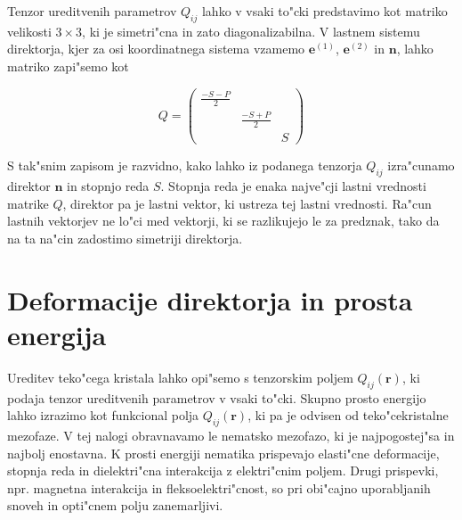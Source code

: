 \documentclass[12pt,twoside,openright,final,a4paper]{report}
\renewcommand{\vec}{\mathbf}
\begin{document}
Tenzor ureditvenih parametrov $Q_{ij}$ lahko v vsaki to"cki predstavimo kot matriko velikosti $3\times 3$, ki je simetri"cna in zato diagonalizabilna. 
V lastnem sistemu direktorja, kjer za osi koordinatnega sistema vzamemo $\vec e^{(1)}$, $\vec e^{(2)}$ in $\vec n$, lahko matriko zapi"semo kot

\begin{equation}
 Q = \begin{pmatrix}
   \frac{-S-P}{2} & & \\
  & \frac{-S+P}{2} & \\
    &   & S
 \end{pmatrix}
\end{equation}

S tak"snim zapisom je razvidno, kako lahko iz podanega tenzorja $Q_{ij}$ izra"cunamo direktor $\vec n$ in stopnjo reda $S$. 
Stopnja reda je enaka najve"cji lastni vrednosti matrike $Q$, direktor pa je lastni vektor, ki ustreza tej lastni vrednosti. 
Ra"cun lastnih vektorjev ne lo"ci med vektorji, ki se razlikujejo le za predznak, tako da na ta na"cin zadostimo simetriji direktorja. 

\section{Deformacije direktorja in prosta energija}

Ureditev teko"cega kristala lahko opi"semo s tenzorskim poljem $Q_{ij}(\vec r)$, ki podaja tenzor ureditvenih parametrov v vsaki to"cki. 
Skupno prosto energijo lahko izrazimo kot funkcional polja $Q_{ij}(\vec r)$, ki pa je odvisen od teko"cekristalne mezofaze. 
V tej nalogi obravnavamo le nematsko mezofazo, ki je najpogostej"sa in najbolj enostavna. 
K prosti energiji nematika prispevajo elasti"cne deformacije, stopnja reda in dielektri"cna interakcija z elektri"cnim poljem. 
Drugi prispevki, npr. magnetna interakcija in fleksoelektri"cnost, so pri obi"cajno uporabljanih snoveh in opti"cnem polju zanemarljivi.
\end{document}
